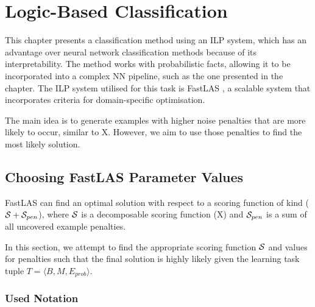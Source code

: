 \chapter{Logic-Based Classification}


This chapter presents a  classification method using an ILP system, which has an advantage over neural network classification methods because of its interpretability.
The method works with probabilistic facts, allowing it to be incorporated into a complex NN pipeline, such as the one presented in the chapter.
The ILP system utilised for this task is FastLAS \cite{RefWorks:RefID:19-law2020fastlas:}, a scalable system that incorporates criteria for domain-specific optimisation.

The main idea is to generate examples with higher noise penalties that are more likely to occur, similar to X.
However, we aim to use those penalties to find the most likely solution.


\section{Choosing FastLAS Parameter Values}
\label{choosing-fastlas-parameter-values}

FastLAS can find an optimal solution with respect to a scoring function of kind ($\mathcal{S} + \mathcal{S}_{pen}$), where $\mathcal{S}$ is a decomposable scoring function (X) and $\mathcal{S}_{pen}$ is a sum of all uncovered example penalties.

In this section, we attempt to find the appropriate scoring function $\mathcal{S}$ and values for penalties such that the final solution is highly likely given the learning task tuple $T = \langle B, M, E_{prob} \rangle$. 

\subsection{Used Notation}

